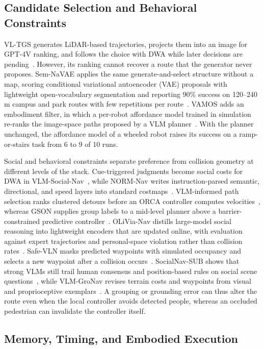 \subsection{Candidate Selection and Behavioral Constraints}

VL-TGS generates LiDAR-based trajectories, projects them into an image for GPT-4V ranking, and follows the choice with DWA while later decisions are pending~\cite{P_F05}. However, its ranking cannot recover a route that the generator never proposes. Sem-NaVAE applies the same generate-and-select structure without a map, scoring conditional variational autoencoder (VAE) proposals with lightweight open-vocabulary segmentation and reporting 90\% success on 120--240\,m campus and park routes with few repetitions per route~\cite{P_R25}. VAMOS adds an embodiment filter, in which a per-robot affordance model trained in simulation re-ranks the image-space paths proposed by a VLM planner~\cite{P_R26}. With the planner unchanged, the affordance model of a wheeled robot raises its success on a ramp-or-stairs task from 6 to 9 of 10 runs.

Social and behavioral constraints separate preference from collision geometry at different levels of the stack. Cue-triggered judgments become social costs for DWA in VLM-Social-Nav~\cite{P_M07}, while NORM-Nav writes instruction-parsed semantic, directional, and speed layers into standard costmaps~\cite{P_R30}. VLM-informed path selection ranks clustered detours before an ORCA controller computes velocities~\cite{P_E43}, whereas GSON supplies group labels to a mid-level planner above a barrier-constrained predictive controller~\cite{P_F06}. OLiVia-Nav distills large-model social reasoning into lightweight encoders that are updated online, with evaluation against expert trajectories and personal-space violation rather than collision rates~\cite{P_R29}. Safe-VLN masks predicted waypoints with simulated occupancy and selects a new waypoint after a collision occurs~\cite{P_M18}. SocialNav-SUB shows that strong VLMs still trail human consensus and position-based rules on social scene questions~\cite{P_S44}, while VLM-GroNav revises terrain costs and waypoints from visual and proprioceptive exemplars~\cite{P_S40}. A grouping or grounding error can thus alter the route even when the local controller avoids detected people, whereas an occluded pedestrian can invalidate the controller itself.

\subsection{Memory, Timing, and Embodied Execution}


